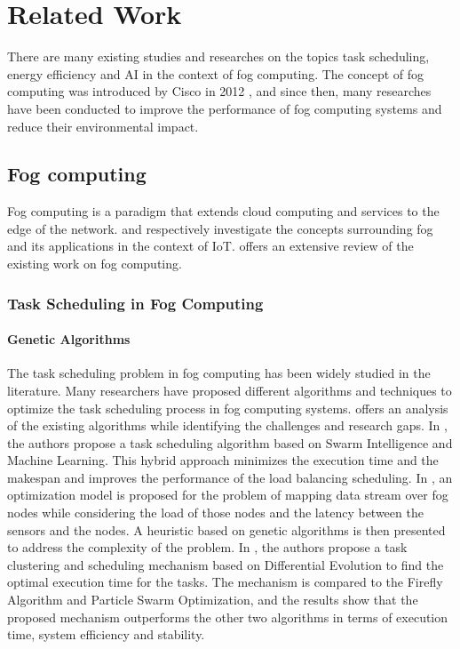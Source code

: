 \chapter{Related Work}
\label{chap:related-work}

There are many existing studies and researches on the topics task scheduling, energy efficiency and AI in the context
of fog computing. The concept of fog computing was introduced by Cisco in 2012 \cite{bonomi-et-al-2012}, and since
then, many researches have been conducted to improve the performance of fog computing systems and reduce their
environmental impact.

\section{Fog computing}
\label{sec:fog-computing}

Fog computing is a paradigm that extends cloud computing and services to the edge of the network.
\cite{rana-abubacker-2023} and \cite{abubacker-et-al-2023} respectively investigate the concepts surrounding fog
and its applications in the context of IoT. \cite{al-musawi-et-al-2023} offers an extensive review of the existing
work on fog computing.

\subsection{Task Scheduling in Fog Computing}
\label{subsec:task-scheduling}

\subsubsection*{Genetic Algorithms}
\label{subsubsec:genetic-algorithms}

The task scheduling problem in fog computing has been widely studied in the literature. Many researchers have proposed
different algorithms and techniques to optimize the task scheduling process in fog computing systems.
\cite{misirli-casalicchio-2024} offers an analysis of the existing algorithms while identifying the challenges and
research gaps. In \cite{rjoub-bentahar-2017}, the authors propose a task scheduling algorithm based on Swarm
Intelligence and Machine Learning. This hybrid approach minimizes the execution time and the makespan and improves the
performance of the load balancing scheduling. In \cite{canali-lancellotti-2019}, an optimization model is proposed for
the problem of mapping data stream over fog nodes while considering the load of those nodes and the latency between the
sensors and the nodes. A heuristic based on genetic algorithms is then presented to address the complexity of the
problem. In \cite{yousif-et-al-2024}, the authors propose a task clustering and scheduling mechanism based on
Differential Evolution to find the optimal execution time for the tasks. The mechanism is compared to the Firefly
Algorithm and Particle Swarm Optimization, and the results show that the proposed mechanism outperforms the other two
algorithms in terms of execution time, system efficiency and stability.

